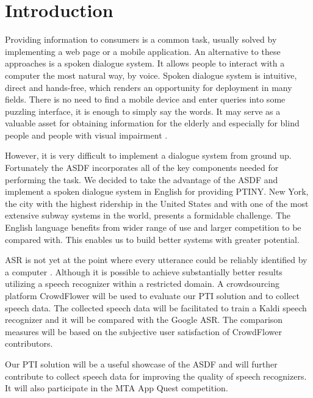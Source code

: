 

\chapter*{Introduction}

Providing information to consumers is a common task, usually solved by implementing a web page or a mobile application.
An alternative to these approaches is a spoken dialogue system.
It allows people to interact with a computer the most natural way, by voice.
Spoken dialogue system is intuitive, direct and hands-free, which renders an opportunity for deployment in many fields.
There is no need to find a mobile device and enter queries into some puzzling interface, it is enough to simply say the words.
It may serve as a valuable asset for obtaining information for the elderly and especially for blind people and people with visual impairment \cite{blind}. %

However, it is very difficult to implement a dialogue system from ground up.
Fortunately the \acf{ASDF} \cite{asdf} incorporates all of the key components needed for performing the task.
We decided to take the advantage of the \ac{ASDF} and implement a spoken dialogue system in English for providing \acf{PTINY}.
New York, the city with the highest ridership in the United States and with one of the most extensive subway systems in the world, presents a formidable challenge.
The English language benefits from wider range of use and larger competition to be compared with.
This enables us to build better systems with greater potential.

\acf{ASR} is not yet at the point where every utterance could be reliably identified by a computer \cite{asr}.
Although it is possible to achieve substantially better results utilizing a speech recognizer within a restricted domain.
A crowdsourcing platform CrowdFlower will be used to evaluate our \ac{PTI} solution and to collect speech data.
The collected speech data will be facilitated to train a Kaldi speech recognizer and it will be compared with the Google \ac{ASR}.
The comparison measures will be based on the subjective user satisfaction of CrowdFlower contributors. %

Our \ac{PTI} solution will be a useful showcase of the \ac{ASDF} and will further contribute to collect speech data for improving the quality of speech recognizers. It will also participate in the \ac{MTA} App Quest competition.

